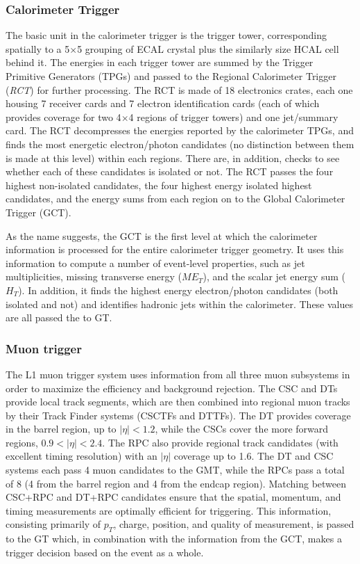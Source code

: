 \subsubsection{Calorimeter Trigger}
The basic unit in the calorimeter trigger is the trigger tower, corresponding
spatially to a 5$\times$5 grouping of ECAL crystal plus the similarly size HCAL
cell behind it. The energies in each trigger tower are summed by the Trigger
Primitive Generators (TPGs) and passed to the Regional Calorimeter Trigger
(\emph{RCT}) for further processing.  The RCT is made of 18 electronics crates,
each one housing 7 receiver cards and 7 electron identification cards (each of
which provides coverage for two 4$\times$4 regions of trigger towers) and one
jet/summary card. The RCT decompresses the energies reported by the calorimeter
TPGs, and finds the most energetic electron/photon candidates (no distinction
between them is made at this level) within each regions. There are, in addition,
checks to see whether each of these candidates is isolated or not. The RCT
passes the four highest non-isolated candidates, the four highest energy
isolated highest candidates, and the energy sums from each region on to the
Global Calorimeter Trigger (GCT).

As the name suggests, the GCT is the first level at which the calorimeter
information is processed for the entire calorimeter trigger geometry. It uses
this information to compute a number of event-level properties, such as jet
multiplicities, missing transverse energy ($ME_T$), and the scalar jet energy sum
($H_T$). In addition, it finds the highest energy electron/photon candidates
(both isolated and not) and identifies hadronic jets within the calorimeter.
These values are all passed the to GT.

\subsubsection{Muon trigger}
The L1 muon trigger system uses information from all three muon subsystems in
order to maximize the efficiency and background rejection. The CSC and DTs
provide local track segments, which are then combined into regional muon tracks
by their Track Finder systems (CSCTFs and DTTFs). The DT provides coverage in
the barrel region, up to $|\eta| < 1.2$, while the CSCs cover the more forward
regions, $0.9 < |\eta| < 2.4$. The RPC also provide regional
track candidates (with excellent timing resolution) with an $|\eta|$ coverage up
to 1.6. The DT and CSC systems each pass 4 muon candidates to the GMT, while the
RPCs pass a total of 8 (4 from the barrel region and 4 from the endcap region).
Matching between CSC+RPC and DT+RPC candidates ensure that the spatial,
momentum, and timing measurements are optimally efficient for triggering.
This information, consisting primarily of $p_T$, charge, position, and quality
of measurement, is passed to the GT which, in combination with the information
from the GCT, makes a trigger decision based on the event as a whole.

